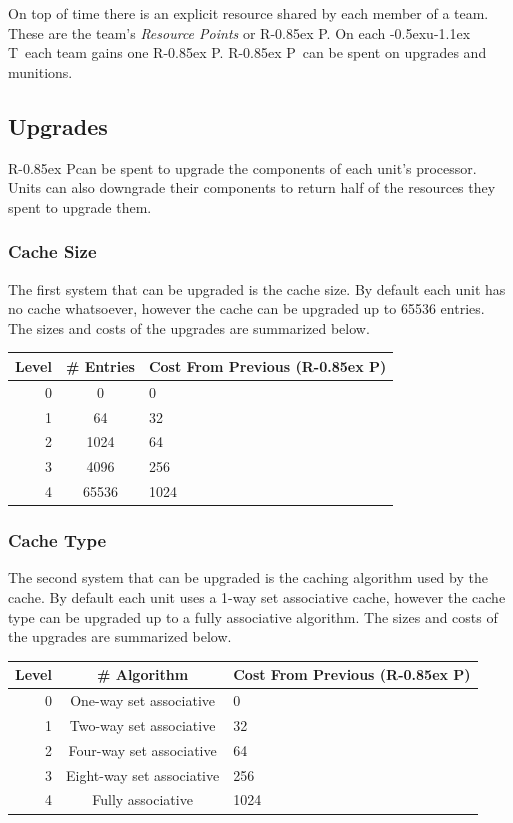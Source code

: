 \documentclass{article}
\newcommand{\UT}{\lower-0.5ex\hbox{u}\kern-1.1ex T}
\newcommand{\RP}{R\kern-0.85ex P}
\begin{document}
On top of time there is an explicit resource shared by each member of a team.
These are the team's \textit{Resource Points} or \RP. On each \UT\ each team
gains one \RP. \RP\ can be spent on upgrades and munitions.

\subsection{Upgrades}

\RP can be spent to upgrade the components of each unit's processor. Units can
also downgrade their components to return half of the resources they spent to
upgrade them.

\subsubsection{Cache Size}

The first system that can be upgraded is the cache size. By default each unit
has no cache whatsoever, however the cache can be upgraded up to 65536 entries.
The sizes and costs of the upgrades are summarized below.

\begin{minipage}{\textwidth}
\centering
\begin{tabular}{|r|c|l|}
    \hline Level & \# Entries & Cost From Previous (\RP) \\ \hline
    0 & 0 & 0 \\ \hline
    1 & 64 & 32 \\ \hline
    2 & 1024 & 64 \\ \hline
    3 & 4096 & 256 \\ \hline
    4 & 65536 & 1024 \\ \hline
\end{tabular}
\end{minipage}

\subsubsection{Cache Type}

The second system that can be upgraded is the caching algorithm used by the
cache. By default each unit uses a 1-way set associative cache, however the
cache type can be upgraded up to a fully associative algorithm. The sizes and
costs of the upgrades are summarized below.

\begin{minipage}{\textwidth}
\centering
\begin{tabular}{|r|c|l|}
    \hline Level & \# Algorithm & Cost From Previous (\RP) \\ \hline
    0 & One-way set associative & 0 \\ \hline
    1 & Two-way set associative & 32 \\ \hline
    2 & Four-way set associative & 64 \\ \hline
    3 & Eight-way set associative & 256 \\ \hline
    4 & Fully associative & 1024 \\ \hline
\end{tabular}
\end{minipage}
\end{document}
